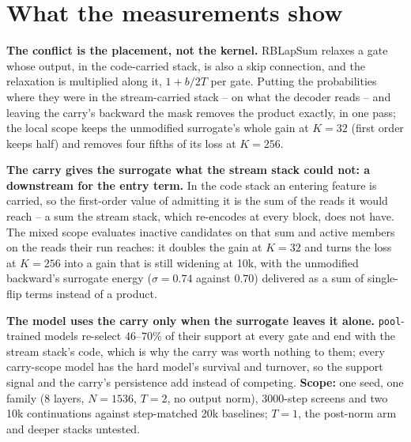 \documentclass[10pt,a4paper]{article}
\newcommand{\code}[1]{\texttt{#1}}
\begin{document}
\section{What the measurements show}

\textbf{The conflict is the placement, not the kernel.}  RBLapSum relaxes a gate whose output, in the code-carried
stack, is also a skip connection, and the relaxation is multiplied along it, \(1+b/2T\) per gate.  Putting the
probabilities where they were in the stream-carried stack -- on what the decoder reads -- and leaving the carry's
backward the mask removes the product exactly, in one pass; the local scope keeps the unmodified surrogate's whole
gain at \(K=32\) (first order keeps half) and removes four fifths of its loss at \(K=256\).

\textbf{The carry gives the surrogate what the stream stack could not: a downstream for the entry term.}  In the
code stack an entering feature is carried, so the first-order value of admitting it is the sum of the reads it would
reach -- a sum the stream stack, which re-encodes at every block, does not have.  The mixed scope evaluates inactive candidates on that sum and active members
on the reads their run reaches: it doubles the gain at \(K=32\) and turns the loss at \(K=256\) into a gain that is
still widening at 10k, with the unmodified backward's surrogate energy (\(\sigma=0.74\) against \(0.70\)) delivered as
a sum of single-flip terms instead of a product.

\textbf{The model uses the carry only when the surrogate leaves it alone.}  \code{pool}-trained models re-select
\(46\)--\(70\%\) of their support at every gate and end with the stream stack's code, which is why
the carry was worth nothing to them; every carry-scope model has the hard model's survival and turnover, so the
support signal and the carry's persistence add instead of competing.  \textbf{Scope:} one seed, one family (8 layers, \(N=1536\), \(T=2\), no output norm), 3000-step screens and two 10k
continuations against step-matched 20k baselines; \(T=1\), the post-norm arm and deeper stacks untested.
\end{document}
